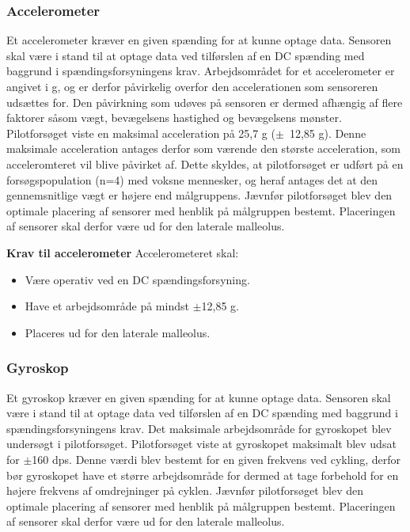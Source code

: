 \subsubsection{Accelerometer}
Et accelerometer kræver en given spænding for at kunne optage data. Sensoren skal være i stand til at optage data ved tilførslen af en DC spænding med baggrund i spændingsforsyningens krav. Arbejdsområdet for et accelerometer er angivet i g, og er derfor påvirkelig overfor den accelerationen som sensoreren udsættes for. Den påvirkning som udøves på sensoren er dermed afhængig af flere faktorer såsom vægt, bevægelsens hastighed og bevægelsens mønster. \newline
Pilotforsøget viste en maksimal acceleration på 25,7 g ($\pm$~12,85 g). Denne maksimale acceleration antages derfor som værende den største acceleration, som acceleromteret vil blive påvirket af. Dette skyldes, at pilotforsøget er udført på en forsøgspopulation (n=4) med voksne mennesker, og heraf antages det at den gennemsnitlige vægt er højere end målgruppens. Jævnfør pilotforsøget blev den optimale placering af sensorer med henblik på målgruppen bestemt. Placeringen af sensorer skal derfor være ud for den laterale malleolus.


\textbf{Krav til accelerometer} \newline 
Accelerometeret skal:
\begin{itemize}
\item Være operativ ved en DC spændingsforsyning.
\item Have et arbejdsområde på mindst $\pm$12,85 g.
\item Placeres ud for den laterale malleolus.
\end{itemize}

\subsubsection{Gyroskop} 
Et gyroskop kræver en given spænding for at kunne optage data. Sensoren skal være i stand til at optage data ved tilførslen af en DC spænding med baggrund i spændingsforsyningens krav. Det maksimale arbejdsområde for gyroskopet blev undersøgt i pilotforsøget. Pilotforsøget viste at gyroskopet maksimalt blev udsat for $\pm$160 dps. Denne værdi blev bestemt for en given frekvens ved cykling, derfor bør gyroskopet have et større arbejdsområde for dermed at tage forbehold for en højere frekvens af omdrejninger på cyklen. Jævnfør pilotforsøget blev den optimale placering af sensorer med henblik på målgruppen bestemt. Placeringen af sensorer skal derfor være ud for den laterale malleolus.


